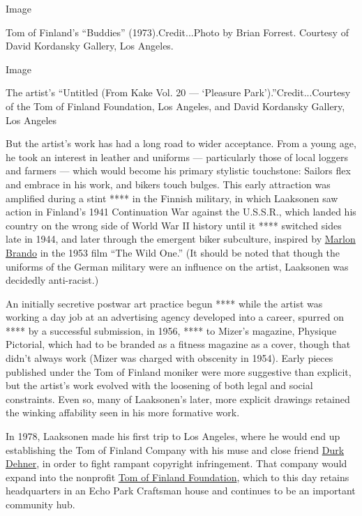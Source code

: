 Image

Tom of Finland's ``Buddies'' (1973).Credit...Photo by Brian Forrest.
Courtesy of David Kordansky Gallery, Los Angeles.

Image

The artist's ``Untitled (From Kake Vol. 20 --- `Pleasure
Park').''Credit...Courtesy of the Tom of Finland Foundation, Los
Angeles, and David Kordansky Gallery, Los Angeles

But the artist's work has had a long road to wider acceptance. From a
young age, he took an interest in leather and uniforms --- particularly
those of local loggers and farmers --- which would become his primary
stylistic touchstone: Sailors flex and embrace in his work, and bikers
touch bulges. This early attraction was amplified during a stint **** in
the Finnish military, in which Laaksonen saw action in Finland's 1941
Continuation War against the U.S.S.R., which landed his country on the
wrong side of World War II history until it **** switched sides late in
1944, and later through the emergent biker subculture, inspired by
\href{https://www.nytimes3xbfgragh.onion/topic/person/marlon-brando}{Marlon
Brando} in the 1953 film ``The Wild One.'' (It should be noted that
though the uniforms of the German military were an influence on the
artist, Laaksonen was decidedly anti-racist.)

An initially secretive postwar art practice begun **** while the artist
was working a day job at an advertising agency developed into a career,
spurred on **** by a successful submission, in 1956, **** to Mizer's
magazine, Physique Pictorial, which had to be branded as a fitness
magazine as a cover, though that didn't always work (Mizer was charged
with obscenity in 1954). Early pieces published under the Tom of Finland
moniker were more suggestive than explicit, but the artist's work
evolved with the loosening of both legal and social constraints. Even
so, many of Laaksonen's later, more explicit drawings retained the
winking affability seen in his more formative work.

In 1978, Laaksonen made his first trip to Los Angeles, where he would
end up establishing the Tom of Finland Company with his muse and close
friend
\href{https://www.nytimes3xbfgragh.onion/slideshow/2016/02/23/t-magazine/inside-tom-house-tom-of-finland-in-los-angeles.html}{Durk
Dehner}, in order to fight rampant copyright infringement. That company
would expand into the nonprofit \href{https://www.tomoffinland.org/}{Tom
of Finland Foundation}, which to this day retains headquarters in an
Echo Park Craftsman house and continues to be an important community
hub.

